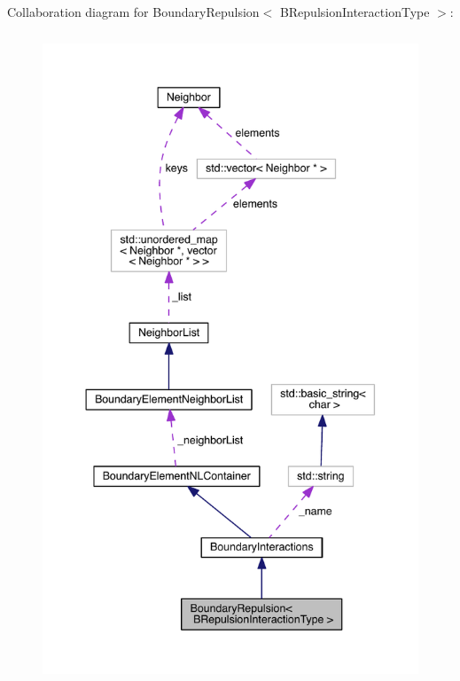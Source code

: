 Collaboration diagram for Boundary\+Repulsion$<$ B\+Repulsion\+Interaction\+Type $>$\+:\nopagebreak
\begin{figure}[H]
\begin{center}
\leavevmode
\includegraphics[height=550pt]{classBoundaryRepulsion__coll__graph}
\end{center}
\end{figure}
